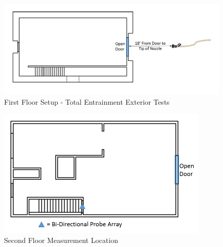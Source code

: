 \documentclass{article}
\begin{document}
\begin{figure}[!ht]
	\centering
	\includegraphics[width=6.5in]{Figures/Air_Entrainment/Measurement_Locations_Firstfloor_Ext.png}
	\caption{First Floor Setup - Total Entrainment Exterior Tests}
	\label{fig:First_Floor_Setup_Total_Entrainment_Exterior_Tests}
\end{figure}

\clearpage

\begin{figure}[!ht]
	\centering
	\includegraphics[width=4in]{Figures/Air_Entrainment/Measurement_Locations_Secondfloor.png}
	\caption{Second Floor Measurement Location}
	\label{fig:Second_Floor_Measurement_Location}
\end{figure}

\vspace*{\baselineskip}
\end{document}
